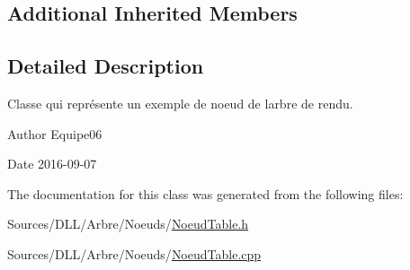 \subsection*{Additional Inherited Members}


\subsection{Detailed Description}
Classe qui représente un exemple de noeud de l\textquotesingle{}arbre de rendu. 

\begin{DoxyAuthor}{Author}
Equipe06 
\end{DoxyAuthor}
\begin{DoxyDate}{Date}
2016-\/09-\/07 
\end{DoxyDate}


The documentation for this class was generated from the following files\+:\begin{DoxyCompactItemize}
\item 
Sources/\+D\+L\+L/\+Arbre/\+Noeuds/\hyperlink{_noeud_table_8h}{Noeud\+Table.\+h}\item 
Sources/\+D\+L\+L/\+Arbre/\+Noeuds/\hyperlink{_noeud_table_8cpp}{Noeud\+Table.\+cpp}\end{DoxyCompactItemize}
